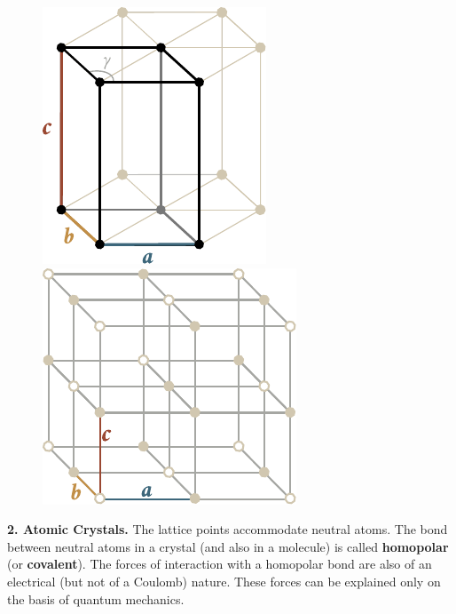 \begin{figure}[t]
	\begin{minipage}[t]{0.5\linewidth}
		\begin{center}
			\includegraphics[scale=1.0]{figures/ch_13/fig_13_4.pdf}
			\caption[]{}
			\label{fig:13_4}
		\end{center}
	\end{minipage}
	\hspace{-0.05cm}
	\begin{minipage}[t]{0.5\linewidth}
		\begin{center}
			\includegraphics[scale=1.0]{figures/ch_13/fig_13_5.pdf}
			\caption[]{}
			\label{fig:13_5}
		\end{center}
	\end{minipage}
	\vspace{-0.4cm}
\end{figure}

\textbf{2. Atomic Crystals.} The lattice points accommodate neutral atoms. The bond between neutral atoms in a crystal (and also in a molecule) is called \textbf{homopolar} (or \textbf{covalent}). The forces of interaction with a homopolar bond are also of an electrical (but not of a Coulomb) nature. These forces can be explained only on the basis of quantum mechanics.

